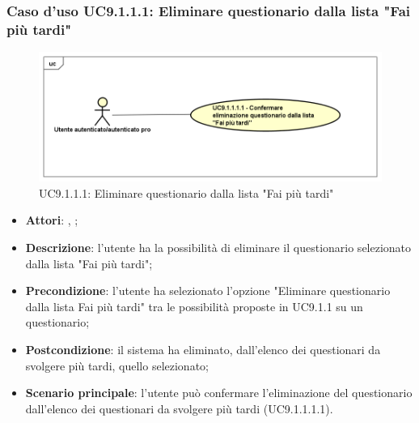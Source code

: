 				\subsubsection{Caso d'uso UC9.1.1.1: Eliminare questionario dalla lista "Fai più tardi"}
				\label{UC9.1.4.1}
				\begin{figure}[h]
					\centering
					\includegraphics[scale=0.5,keepaspectratio]{UML/UC9_1_1_1.png}
					\caption{UC9.1.1.1: Eliminare questionario dalla lista "Fai più tardi"}
				\end{figure}
				\FloatBarrier
				\begin{itemize}
					\item \textbf{Attori}: \uau, \uaupro;
					\item \textbf{Descrizione}: l'utente ha la possibilità di eliminare il questionario selezionato dalla lista "Fai più tardi";
					\item \textbf{Precondizione}: l'utente ha selezionato l'opzione "Eliminare questionario dalla lista Fai più tardi" tra le possibilità proposte in UC9.1.1 su un questionario;
					\item \textbf{Postcondizione}: il sistema ha eliminato, dall'elenco dei questionari da svolgere più tardi, quello selezionato;
					\item \textbf{Scenario principale}: l'utente può confermare l'eliminazione del questionario dall'elenco dei questionari da svolgere più tardi (UC9.1.1.1.1).	
				\end{itemize}
				
